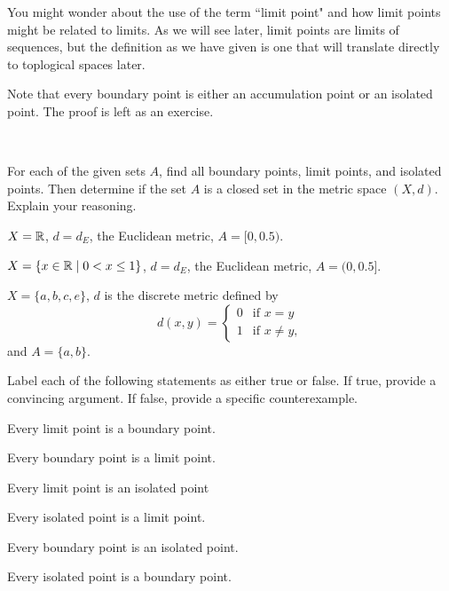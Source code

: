 You might wonder about the use of the term ``limit point" and how limit points might be related to limits. As we will see later, limit points are limits of sequences, but the definition as we have given is one that will translate directly to toplogical spaces later. 

Note that every boundary point is either an accumulation point or an isolated point. The proof is left as an exercise.

\begin{pa} ~
\be
\item For each of the given sets $A$, find all boundary points, limit points, and isolated points. Then determine if the set $A$ is a closed set in the metric space $(X,d)$. Explain your reasoning.
	\ba
	\item $X = \mathbb{R}$, $d = d_E$, the Euclidean metric, $A = [0,0.5)$.

	\item $X = \{x \in \mathbb{R} \mid 0 < x \leq 1\}$, $d = d_E$, the Euclidean metric, $A = (0,0.5]$. 

	\item $X = \{a,b,c,e\}$, $d$ is the discrete metric defined by 
\[d(x,y) = \begin{cases} 0 &\text{if } x = y \\ 1 &\text{if } x \neq y, \end{cases}\]
and $A = \{a,b\}$. 

	\ea
	
\item Label each of the following statements as either true or false. If true, provide a convincing argument. If false, provide a specific counterexample.
	\ba
	\item Every limit point is a boundary point.
	
	\item Every boundary point is a limit point.

	\item Every limit point is an isolated point
	
	\item Every isolated point is a limit point.
	
	\item Every boundary point is an isolated point.
	
	\item Every isolated point is a boundary point.
	
	\ea
	
\ee

\end{pa}

